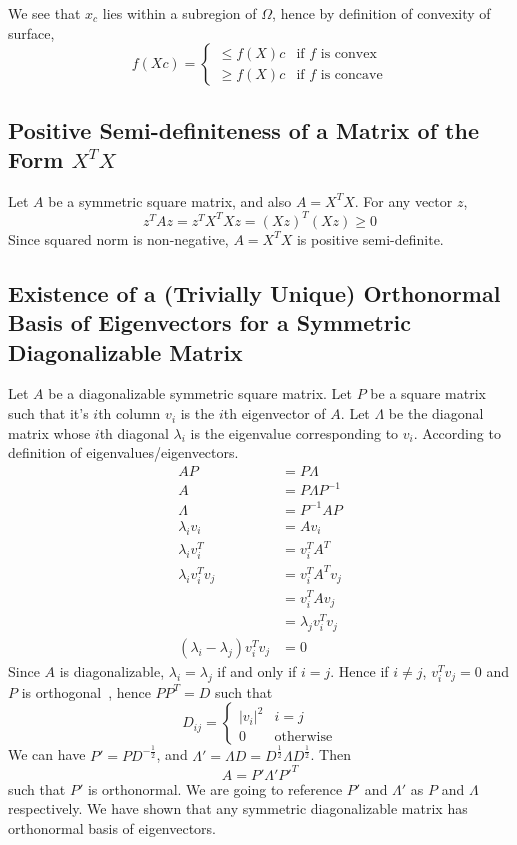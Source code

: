 \documentclass{article}
\numberwithin{equation}{subsection}
\begin{document}
We see that $x_c$ lies within a subregion of $\Omega$, hence by definition of convexity of surface, 
\begin{equation}
    f(Xc) = 
    \begin{cases}
        \leq  f(X)c & \text{if $f$ is convex}\\
        \geq  f(X)c & \text{if $f$ is concave}
    \end{cases}
\end{equation}
\subsection{Positive Semi-definiteness of a Matrix of the Form $X^TX$}
Let $A$ be a symmetric square matrix, and also $A=X^TX$. For any vector $z$, 
\begin{equation}
z^TAz = z^TX^TXz = (Xz)^T(Xz) \geq 0
\end{equation}
Since squared norm is non-negative, $A=X^TX$ is positive semi-definite.
\subsection{Existence of a (Trivially Unique) Orthonormal Basis of Eigenvectors for a Symmetric Diagonalizable Matrix}
Let $A$ be a diagonalizable symmetric square matrix. Let $P$ be a square matrix such that it's $i$th column $v_i$ is the $i$th eigenvector of $A$. Let $\Lambda$ be the diagonal matrix whose $i$th diagonal $\lambda_i$ is the eigenvalue corresponding to $v_i$. According to definition of eigenvalues/eigenvectors.
\begin{align}
    AP &= P\Lambda\\
    A &= P\Lambda P^{-1}\\
    \Lambda &= P^{-1}AP\\
    \lambda_iv_i &= Av_i\\
    \lambda_iv_i^T &= v_i^TA^T\\
    \lambda_iv_i^Tv_j &= v_i^TA^Tv_j\\
    &= v_i^TAv_j\\
    &= \lambda_jv_i^Tv_j\\
    (\lambda_i-\lambda_j)v_i^Tv_j &= 0
\end{align}
Since $A$ is diagonalizable, $\lambda_i=\lambda_j$ if and only if $i=j$. Hence if $i \neq j$, $v_i^Tv_j = 0$ and $P$ is orthogonal~\cite{magidin_linear_2011}, hence 
$PP^T = D$ such that 
\begin{equation}
D_{ij} = \begin{cases}
    |v_i|^2 & i = j\\
    0 & \text{otherwise}
\end{cases}
\end{equation}
We can have $P' = PD^{-\frac{1}{2}}$, and $\Lambda' = \Lambda D = D^{\frac{1}{2}} \Lambda D^{\frac{1}{2}}$. Then
\begin{equation}
    A = P'\Lambda'P'^T 
\end{equation}
such that $P'$ is orthonormal. We are going to reference $P'$ and $\Lambda'$ as $P$ and $\Lambda$ respectively. We have shown that any symmetric diagonalizable matrix has orthonormal basis of eigenvectors.
\end{document}
